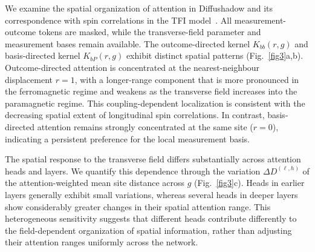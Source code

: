 \documentclass[pdflatex,sn-nature]{sn-jnl}%
\theoremstyle{thmstyleone}%
\theoremstyle{thmstyletwo}%
\theoremstyle{thmstylethree}%
\begin{document}
We examine the spatial organization of attention in Diffushadow and its correspondence with spin correlations in the TFI model~\cite{clark2019does}. All measurement-outcome tokens are masked, while the transverse-field parameter and measurement bases remain available. The outcome-directed kernel $K_{bb}(r,g)$ and basis-directed kernel $K_{bP}(r,g)$ exhibit distinct spatial patterns (Fig.~\ref{fig3}a,b). Outcome-directed attention is concentrated at the nearest-neighbour displacement $r=1$, with a longer-range component that is more pronounced in the ferromagnetic regime and weakens as the transverse field increases into the paramagnetic regime. This coupling-dependent localization is consistent with the decreasing spatial extent of longitudinal spin correlations. In contrast, basis-directed attention remains strongly concentrated at the same site ($r=0$), indicating a persistent preference for the local measurement basis.

The spatial response to the transverse field differs substantially across attention heads and layers. We quantify this dependence through the variation $\Delta D^{(\ell,h)}$ of the attention-weighted mean site distance across $g$ (Fig.~\ref{fig3}c). Heads in earlier layers generally exhibit small variations, whereas several heads in deeper layers show considerably greater changes in their spatial attention range. This heterogeneous sensitivity suggests that different heads contribute differently to the field-dependent organization of spatial information, rather than adjusting their attention ranges uniformly across the network.
\end{document}
